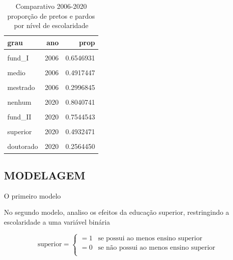 \documentclass[
  12pt,
  letterpaper,
  DIV=11,
  numbers=noendperiod]{scrartcl}
\begin{document}
\begin{table}
\caption{Comparativo 2006-2020 proporção de pretos e pardos por nível de
escolaridade}\tabularnewline

\centering
\begin{tabular}[t]{l|r|r}
\hline
grau & ano & prop\\
\hline
\cellcolor{gray!6}{nenhum} & \cellcolor{gray!6}{2006} & \cellcolor{gray!6}{0.6595917}\\
\hline
fund\_I & 2006 & 0.6546931\\
\hline
\cellcolor{gray!6}{fund\_II} & \cellcolor{gray!6}{2006} & \cellcolor{gray!6}{0.5905084}\\
\hline
medio & 2006 & 0.4917447\\
\hline
\cellcolor{gray!6}{superior} & \cellcolor{gray!6}{2006} & \cellcolor{gray!6}{0.3153624}\\
\hline
mestrado & 2006 & 0.2996845\\
\hline
\cellcolor{gray!6}{doutorado} & \cellcolor{gray!6}{2006} & \cellcolor{gray!6}{0.1794872}\\
\hline
nenhum & 2020 & 0.8040741\\
\hline
\cellcolor{gray!6}{fund\_I} & \cellcolor{gray!6}{2020} & \cellcolor{gray!6}{0.7883777}\\
\hline
fund\_II & 2020 & 0.7544543\\
\hline
\cellcolor{gray!6}{medio} & \cellcolor{gray!6}{2020} & \cellcolor{gray!6}{0.7054525}\\
\hline
superior & 2020 & 0.4932471\\
\hline
\cellcolor{gray!6}{mestrado} & \cellcolor{gray!6}{2020} & \cellcolor{gray!6}{0.3056507}\\
\hline
doutorado & 2020 & 0.2564450\\
\hline
\end{tabular}
\end{table}

\hypertarget{modelagem}{%
\subsection{MODELAGEM}\label{modelagem}}

O primeiro modelo

No segundo modelo, analiso os efeitos da educação superior, restringindo
a escolaridade a uma variável binária

\[
\text{superior}=
\begin{cases}
    =1 & \text{se possui ao menos ensino superior} \\
    =0 & \text{se não possui ao menos ensino superior} \\
\end{cases}
\]
\end{document}
